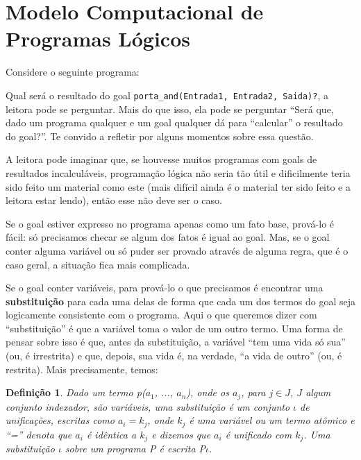 \documentclass{article}
\newtheorem{definition}{Definição}[section]
\theoremstyle{remark}
\theoremstyle{theorem}
\begin{document}
\section{Modelo Computacional de Programas Lógicos}

Considere o seguinte programa:




Qual será o resultado do goal {\tt porta\_and(Entrada1, Entrada2, Saida)?}, a leitora pode se perguntar. Mais do que isso, ela pode se perguntar ``Será que, dado um programa qualquer e um goal qualquer dá para ``calcular'' o resultado do goal?''. Te convido a refletir por alguns momentos sobre essa questão.


A leitora pode imaginar que, se houvesse muitos programas com goals de resultados incalculáveis, programação lógica não seria tão útil e dificilmente teria sido feito um material como este (mais difícil ainda é o material ter sido feito e a leitora estar lendo), então esse não deve ser o caso.

Se o goal estiver expresso no programa apenas como um fato base, prová-lo é fácil: só precisamos checar se algum dos fatos é igual ao goal. Mas, se o goal conter alguma variável ou só puder ser provado através de alguma regra, que é o caso geral, a situação fica mais complicada.

Se o goal conter variáveis, para prová-lo o que precisamos é encontrar uma \textbf{substituição} para cada uma delas de forma que cada um dos termos do goal seja logicamente consistente com o programa. Aqui o que queremos dizer com ``substituição'' é que a variável toma o valor de um outro termo. Uma forma de pensar sobre isso é que, antes da substituição, a variável ``tem uma vida só sua'' (ou, é irrestrita) e que, depois, sua vida é, na verdade, ``a vida de
outro'' (ou, é restrita). Mais precisamente, temos:\\

\begin{definition} Dado um termo {\it p($a_1$, ..., $a_n$)}, onde os $a_j$, para $j \in J$, $J$ algum conjunto indexador, são variáveis, uma substituição é um conjunto $\iota$ de \textit{unificações}, escritas como $a_i = k_j$, onde $k_j$ é uma variável ou um termo atômico e ``='' denota que $a_i$ é idêntica a $k_j$ e dizemos que $a_i$ é unificado com $k_j$.
  Uma substituição $\iota$ sobre um programa P é escrita P$\iota$.
\end{definition}
\end{document}
